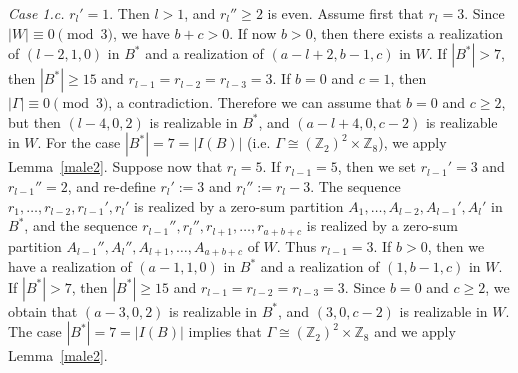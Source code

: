 \documentclass[final]{dmtcs-episciences}
\newcommand{\zet}{\mathbb{Z}}
\begin{document}
\textit{Case 1.c.} $r_l'=1$.
{Then $l> 1$}, and $r_l''\geq 2$ is even. 
Assume first that $r_l=3$. Since $|W|\equiv 0\pmod 3$, we have $b+c>0$.
If now $b>0$, then there exists a realization of $(l-2,1,0)$  in $B^*$ and a realization of $(a-l+2,b-1,c)$ in $W$.
 If $|B^{*}|>7$, then $|B^{*}|\geq 15$ and $r_{l-1}=r_{l-2}=r_{l-3}=3$. If $b=0$ and $c=1$, then $|\Gamma|\equiv 0\pmod 3$, a contradiction. Therefore we can assume that $b=0$ and $c\geq 2$, but then  $(l-4,0,2)$ is realizable in $B^*$, and {$(a-l+4,0,c-2)$} is realizable in $W$. For the case $|B^{*}|=7= |I(B)|$ (i.e. $\Gamma \cong (\zet_2)^2\times\zet_8$), we apply Lemma~\ref{male2}.
Suppose now that $r_l=5$. If $r_{l-1}=5$, then we set $r_{l-1}'=3$ and
 $r_{l-1}''=2$, and re-define $r_l':=3$ and $r_{l}'':=r_l-3$.
The sequence $r_1,\ldots,r_{l-2},r_{l-1}',r_l'$ is realized by a zero-sum partition $A_1,\ldots,A_{l-2}, A_{l-1}', A_l'$ in $B^{*}$, and the sequence $r_{l-1}'', r_l'', r_{l+1}, \ldots, r_{a+b+c}$ is realized by a zero-sum partition $A_{l-1}'', A_l'', A_{l+1}, \ldots, A_{a+b+c}$ of $W$. Thus $r_{l-1}=3$. If $b>0$, then we have a realization of $(a-1,1,0)$ in $B^*$ and a realization of $(1,b-1,c)$  in $W$. If $|B^{*}|>7$, then $|B^{*}|\geq 15$ and $r_{l-1}=r_{l-2}=r_{l-3}=3$. Since $b=0$ and $c\geq 2$, we obtain that $(a-3,0,2)$ is realizable in $B^*$, and $(3,0,c-2)$ is realizable in $W$. The case $|B^{*}|=7= |I(B)|$ implies that $\Gamma \cong (\zet_2)^2\times\zet_8$ and we apply Lemma~\ref{male2}.
\end{document}
